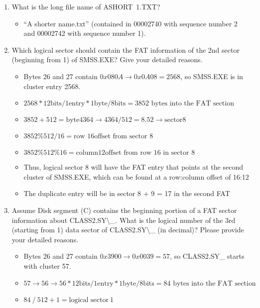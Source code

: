 \documentclass{article}
\begin{document}
    \begin{enumerate}
        \item What is the long file name of ASHORT~1.TXT?
        \begin{itemize}
            \item ``A shorter name.txt'' (contained in 00002740 with sequence number 2 and 00002742 with sequence number 1).
        \end{itemize}
        \item Which logical sector should contain the FAT information of the 2nd sector (beginning from 1) of SMSS.EXE? Give your detailed reasons.
        \begin{itemize}
            \item Bytes 26 and 27 contain $0x080A \rightarrow 0x0A08 = 2568$, so SMSS.EXE is in cluster entry 2568.
            \item $2568 * 12 \text{bits} / 1 \text{entry} * 1 \text{byte} / 8 \text{bits} = \text{3852 bytes into the FAT section}$
            \item $3852 + 512 = \text{byte} 4364 \rightarrow 4364 / 512 = 8.52 \rightarrow \text{sector} 8$
            \item $3852 \% 512 / 16 = \text{row } 16 \text{offset from sector 8}$
            \item $3852 \% 512 \% 16 = \text{column} 12 \text{offset from row 16 in sector 8}$
            \item Thus, logical sector 8 will have the FAT entry that points at the second cluster of SMSS.EXE, which can be found at a row:column offset of 16:12
            \item The duplicate entry will be in sector 8 + 9 = 17 in the second FAT
        \end{itemize}
        \item Assume Disk segment (C) contains the beginning portion of a FAT sector information about CLASS2.SY\textbackslash\_. What is the logical number of the 3rd (starting from 1) data sector of CLASS2.SY\textbackslash\_ (in decimal)? Please provide your detailed reasons.
        \begin{itemize}
            \item Bytes 26 and 27 contain $0x3900 \rightarrow 0x0039 = 57$, so CLASS2.SY\_ starts with cluster 57.
            \item $57 \rightarrow 56 \rightarrow 56 * 12 \text{bits} / 1 \text{entry} * 1 \text{byte} / 8 \text{bits} = \text{84 bytes into the FAT section}$
            \item $84~/~512 + 1= \text{logical sector}~1$

\end{itemize}
\end{enumerate}
\end{document}
